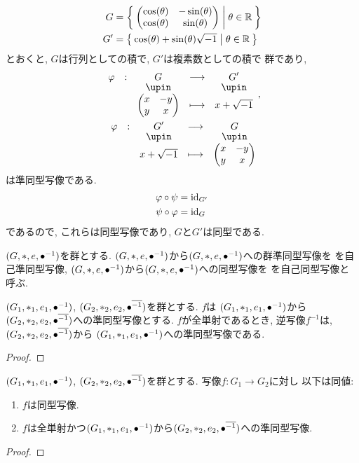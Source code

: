 \begin{example}
  \begin{align*}
    G&=\Set{\begin{pmatrix}\cos(\theta)&-\sin(\theta)\\\cos(\theta)&\sin(\theta)\end{pmatrix}|\theta\in\mathbb{R}}\\
    G'&=\Set{\cos(\theta)+\sin(\theta)\sqrt{-1}|\theta\in\mathbb{R}}
  \end{align*}
  とおくと, $G$は行列としての積で, $G'$は複素数としての積で
  群であり,
  \begin{align*}
    \shazo{\varphi}{G}{G'}
    {\begin{pmatrix}x&-y\\y&x\end{pmatrix}}{x+\sqrt{-1}},\\
    \shazo{\varphi}{G'}{G}
    {x+\sqrt{-1}}{\begin{pmatrix}x&-y\\y&x\end{pmatrix}}
  \end{align*}
  は準同型写像である.
  \begin{align*}
    \varphi \circ \psi &= \operatorname{id}_{G'}\\
    \psi \circ \varphi &= \operatorname{id}_{G}
  \end{align*}
  であるので, これらは同型写像であり,
  $G$と$G'$は同型である.
\end{example}

\begin{remark}
  $(G,\ast,e,{\bullet}^{-1})$を群とする.
  $(G,\ast,e,{\bullet}^{-1})$から$(G,\ast,e,{\bullet}^{-1})$への群準同型写像を
  を自己準同型写像,
  $(G,\ast,e,{\bullet}^{-1})$から$(G,\ast,e,{\bullet}^{-1})$への同型写像を
  を自己同型写像と呼ぶ.
\end{remark}

\begin{lemma}
  $(G_1,\ast_1,e_1,{\bullet}^{-1})$,
  $(G_2,\ast_2,e_2,{\bullet}^{\overline{-1}})$を群とする.
  $f$は
  $(G_1,\ast_1,e_1,{\bullet}^{-1})$から$(G_2,\ast_2,e_2,{\bullet}^{\overline{-1}})$への準同型写像とする.
  $f$が全単射であるとき,
  逆写像$f^{-1}$は,
  $(G_2,\ast_2,e_2,{\bullet}^{\overline{-1}})$から
  $(G_1,\ast_1,e_1,{\bullet}^{-1})$への準同型写像である.
\end{lemma}
\begin{proof}\end{proof}
\begin{prop}
  $(G_1,\ast_1,e_1,{\bullet}^{-1})$,
  $(G_2,\ast_2,e_2,{\bullet}^{\overline{-1}})$を群とする.
  写像$f\colon G_1\to G_2$に対し
  以下は同値:
  \begin{enumerate}
  \item $f$は同型写像.
  \item $f$は全単射かつ$(G_1,\ast_1,e_1,{\bullet}^{-1})$から$(G_2,\ast_2,e_2,{\bullet}^{\overline{-1}})$への準同型写像.
  \end{enumerate}
\end{prop}
\begin{proof}\end{proof}


